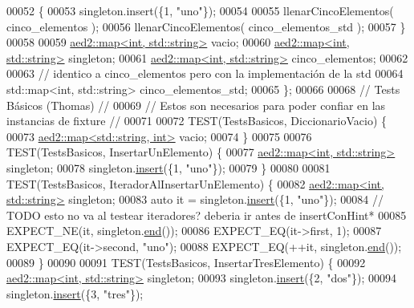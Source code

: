 \begin{DoxyCode}
00052     \{
00053         singleton.insert(\{1, \textcolor{stringliteral}{"uno"}\});
00054 
00055         llenarCincoElementos( cinco\_elementos );
00056         llenarCincoElementos( cinco\_elementos\_std );
00057     \}
00058 
00059     \hyperlink{classaed2_1_1map}{aed2::map<int, std::string>} vacio;
00060     \hyperlink{classaed2_1_1map}{aed2::map<int, std::string>} singleton;
00061     \hyperlink{classaed2_1_1map}{aed2::map<int, std::string>} cinco\_elementos;
00062 
00063     \textcolor{comment}{// identico a cinco\_elementos pero con la implementación de la std}
00064     std::map<int, std::string> cinco\_elementos\_std;
00065 \};
00066 
00068 \textcolor{comment}{// Tests Básicos (Thomas)                                               //}
00069 \textcolor{comment}{// Estos son necesarios para poder confiar en las instancias de fixture //}
00071 \textcolor{comment}{}
00072 TEST(TestsBasicos, DiccionarioVacio) \{
00073     \hyperlink{classaed2_1_1map}{aed2::map<std::string, int>} vacio;
00074 \}
00075 
00076 TEST(TestsBasicos, InsertarUnElemento) \{
00077     \hyperlink{classaed2_1_1map}{aed2::map<int, std::string>} singleton;
00078     singleton.\hyperlink{classaed2_1_1map_a60aacba06b1579630b3c8e996cf248c8_a60aacba06b1579630b3c8e996cf248c8}{insert}(\{1, \textcolor{stringliteral}{"uno"}\});
00079 \}
00080 
00081 TEST(TestsBasicos, IteradorAlInsertarUnElemento) \{
00082     \hyperlink{classaed2_1_1map}{aed2::map<int, std::string>} singleton;
00083     \textcolor{keyword}{auto} it = singleton.\hyperlink{classaed2_1_1map_a60aacba06b1579630b3c8e996cf248c8_a60aacba06b1579630b3c8e996cf248c8}{insert}(\{1, \textcolor{stringliteral}{"uno"}\});
00084     \textcolor{comment}{// TODO esto no va al testear iteradores? deberia ir antes de insertConHint*}
00085     EXPECT\_NE(it, singleton.\hyperlink{classaed2_1_1map_a76023e6a56cb625513e1b5ea028bf983_a76023e6a56cb625513e1b5ea028bf983}{end}());
00086     EXPECT\_EQ(it->first, 1);
00087     EXPECT\_EQ(it->second, \textcolor{stringliteral}{"uno"});
00088     EXPECT\_EQ(++it, singleton.\hyperlink{classaed2_1_1map_a76023e6a56cb625513e1b5ea028bf983_a76023e6a56cb625513e1b5ea028bf983}{end}());
00089 \}
00090 
00091 TEST(TestsBasicos, InsertarTresElemento) \{
00092     \hyperlink{classaed2_1_1map}{aed2::map<int, std::string>} singleton;
00093     singleton.\hyperlink{classaed2_1_1map_a60aacba06b1579630b3c8e996cf248c8_a60aacba06b1579630b3c8e996cf248c8}{insert}(\{2, \textcolor{stringliteral}{"dos"}\});
00094     singleton.\hyperlink{classaed2_1_1map_a60aacba06b1579630b3c8e996cf248c8_a60aacba06b1579630b3c8e996cf248c8}{insert}(\{3, \textcolor{stringliteral}{"tres"}\});

\end{DoxyCode}
